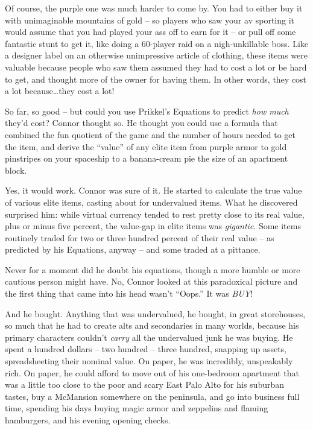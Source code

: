 Of course, the purple one was much harder to come by. You had to
either buy it with unimaginable mountains of gold -- so players who
saw your av sporting it would assume that you had played your ass
off to earn for it -- or pull off some fantastic stunt to get it,
like doing a 60-player raid on a nigh-unkillable boss. Like a
designer label on an otherwise unimpressive article of clothing,
these items were valuable because people who saw them assumed they
had to cost a lot or be hard to get, and thought more of the owner
for having them. In other words, they cost a lot because\ldots{}they
cost a lot!

So far, so good -- but could you use Prikkel's Equations to predict
\emph{how much} they'd cost? Connor thought so. He thought you
could use a formula that combined the fun quotient of the game and
the number of hours needed to get the item, and derive the ``value''
of any elite item from purple armor to gold pinstripes on your
spaceship to a banana-cream pie the size of an apartment block.

Yes, it would work. Connor was sure of it. He started to calculate
the true value of various elite items, casting about for
undervalued items. What he discovered surprised him: while virtual
currency tended to rest pretty close to its real value, plus or
minus five percent, the value-gap in elite items was
\emph{gigantic}. Some items routinely traded for two or three
hundred percent of their real value -- as predicted by his
Equations, anyway -- and some traded at a pittance.

Never for a moment did he doubt his equations, though a more humble
or more cautious person might have. No, Connor looked at this
paradoxical picture and the first thing that came into his head
wasn't ``Oops.'' It was \emph{BUY}!

And he bought. Anything that was undervalued, he bought, in great
storehouses, so much that he had to create alts and secondaries in
many worlds, because his primary characters couldn't \emph{carry}
all the undervalued junk he was buying. He spent a hundred dollars
-- two hundred -- three hundred, snapping up assets, spreadsheeting
their nominal value. On paper, he was incredibly, unspeakably rich.
On paper, he could afford to move out of his one-bedroom apartment
that was a little too close to the poor and scary East Palo Alto
for his suburban tastes, buy a McMansion somewhere on the
peninsula, and go into business full time, spending his days buying
magic armor and zeppelins and flaming hamburgers, and his evening
opening checks.

